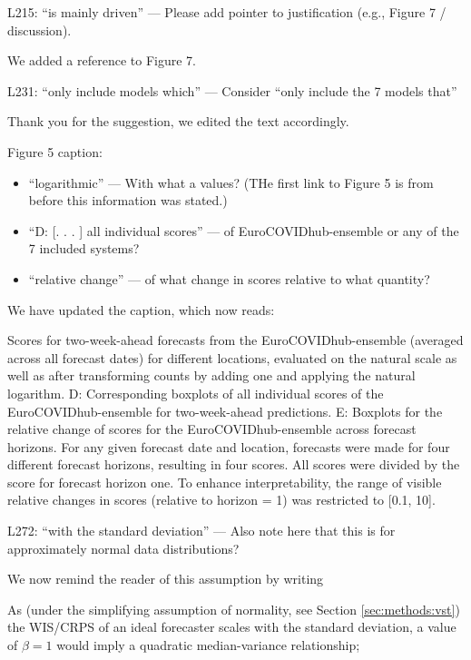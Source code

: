 \documentclass{article}
\newcommand{\black}{\color{black}}
\newcommand{\blue}{\color{blue}}
\newcommand{\indented}{\setlength{\leftskip}{1cm}}
\newcommand{\notindented}{\setlength{\leftskip}{0cm}}
\begin{document}
\blue
L215: “is mainly driven” — Please add pointer to justification (e.g., Figure 7 / discussion).

\black
We added a reference to Figure 7. 

\blue
L231: “only include models which” — Consider “only include the 7 models that”

\black
Thank you for the suggestion, we edited the text accordingly. 

\blue
Figure 5 caption:
\begin{itemize}
    \item “logarithmic” — With what a values? (THe first link to Figure 5 is from before this information was stated.)
    \item “D: [. . . ] all individual scores” — of EuroCOVIDhub-ensemble or any of the 7 included systems?
    \item “relative change” — of what change in scores relative to what quantity?
\end{itemize}

\black
We have updated the caption, which now reads: 

\indented
Scores for two-week-ahead forecasts from the EuroCOVIDhub-ensemble (averaged across all forecast dates) for different locations, evaluated on the natural scale as well as after transforming counts by adding one and applying the natural logarithm. D: Corresponding boxplots of all individual scores of the EuroCOVIDhub-ensemble for two-week-ahead predictions. E: Boxplots for the relative change of scores for the EuroCOVIDhub-ensemble across forecast horizons. For any given forecast date and location, forecasts were made for four different forecast horizons, resulting in four scores. All scores were divided by the score for forecast horizon one. To enhance interpretability, the range of visible relative changes in scores (relative to horizon = 1) was restricted to [0.1, 10].

\notindented

\blue
L272: “with the standard deviation” — Also note here that this is for approximately normal data distributions?

\black 
We now remind the reader of this assumption by writing

\indented

As (under the simplifying assumption of normality, see Section \ref{sec:methods:vst}) the WIS/CRPS of an ideal forecaster scales with the standard deviation, a value of $\beta = 1$ would imply a quadratic median-variance relationship;
\end{document}
